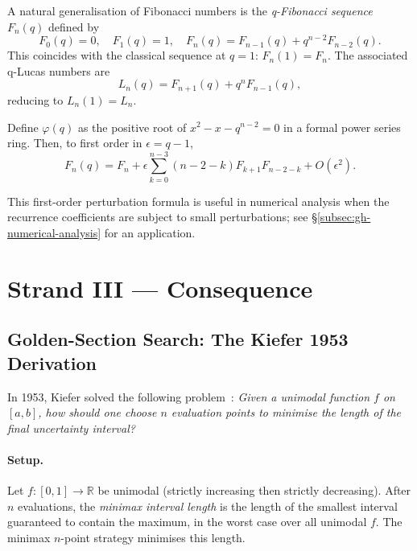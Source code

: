 A natural generalisation of Fibonacci numbers is the
\emph{q-Fibonacci sequence} \(F_n(q)\) defined by
\begin{equation}\label{eq:gh-qfib}
  F_0(q) = 0, \quad F_1(q) = 1, \quad
  F_n(q) = F_{n-1}(q) + q^{n-2} F_{n-2}(q).
\end{equation}
This coincides with the classical sequence at \(q = 1\):
\(F_n(1) = F_n\).
The associated q-Lucas numbers are
\begin{equation}\label{eq:gh-qlucas}
  L_n(q) = F_{n+1}(q) + q^n F_{n-1}(q),
\end{equation}
reducing to \(L_n(1) = L_n\).

\begin{proposition}
\label{prop:gh-qbinet}
Define \(\varphi(q)\) as the positive root of
\(x^2 - x - q^{n-2} = 0\) in a formal power series ring.
Then, to first order in \(\epsilon = q-1\),
\begin{equation}\label{eq:gh-qbinet-approx}
  F_n(q) = F_n + \epsilon \sum_{k=0}^{n-3} (n-2-k) F_{k+1} F_{n-2-k}
         + O(\epsilon^2).
\end{equation}
\end{proposition}
This first-order perturbation formula is useful in numerical analysis
when the recurrence coefficients are subject to small perturbations;
see \S\ref{subsec:gh-numerical-analysis} for an application.

\section{Strand III — Consequence}
\label{sec:gh-strand3}

\subsection{Golden-Section Search: The Kiefer 1953 Derivation}
\label{subsec:gh-kiefer}

In 1953, Kiefer solved the following problem~\cite{kiefer1953sequential}:
\emph{Given a unimodal function \(f\) on \([a,b]\),
how should one choose \(n\) evaluation points to minimise the length
of the final uncertainty interval?}

\paragraph{Setup.}
Let \(f: [0,1] \to \mathbb{R}\) be unimodal (strictly
increasing then strictly decreasing).  After \(n\) evaluations,
the \emph{minimax interval length} is the length of the smallest
interval guaranteed to contain the maximum, in the worst case over all
unimodal \(f\).  The minimax \(n\)-point strategy minimises this length.

